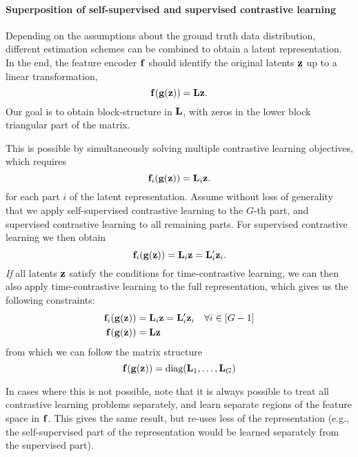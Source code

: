     \paragraph{Superposition of self-supervised and supervised contrastive learning}

        Depending on the assumptions about the ground truth data distribution, different estimation schemes can be combined to obtain a latent representation. In the end, the feature encoder $\mathbf{f}$ should identify the original latents $\mathbf{z}$ up to a linear transformation,
        \begin{equation}
            \mathbf{f}(\mathbf{g}(\mathbf{z})) = \mathbf{L} \mathbf{z}.
        \end{equation}
        Our goal is to obtain block-structure in $\mathbf{L}$, with zeros in the lower block triangular part of the matrix.
        
        This is possible by simultaneously solving multiple contrastive learning objectives, which requires
        \begin{equation}
            \mathbf{f}_i(\mathbf{g}(\mathbf{z})) = \mathbf{L}_i \mathbf{z}.
        \end{equation}
        for each part $i$ of the latent representation.
        Assume without loss of generality that we apply self-supervised contrastive learning to the $G$-th part, and supervised contrastive learning to all remaining parts.
        For supervised contrastive learning we then obtain
        \begin{equation}
            \mathbf{f}_i(\mathbf{g}(\mathbf{z})) = \mathbf{L}_i \mathbf{z} = \mathbf{L}'_i \mathbf{z}_i.
        \end{equation}
        \emph{If} all latents $\mathbf{z}$ satisfy the conditions for time-contrastive learning, we can then also apply time-contrastive learning to the full representation, which gives us the following constraints:
        \begin{align}
            \mathbf{f}_i(\mathbf{g}(\mathbf{z})) &= \mathbf{L}_i \mathbf{z} = \mathbf{L}'_i \mathbf{z}_i \quad \forall i\in[G-1] \\
            \mathbf{f}(\mathbf{g}(\mathbf{z})) &= \mathbf{L} \mathbf{z}
        \end{align}
        from which we can follow the matrix structure
        \begin{equation}
            \mathbf{f}(\mathbf{g}(\mathbf{z})) = \text{diag}(\mathbf{L}_1, \dots, \mathbf{L}_G)
        \end{equation}

        In cases where this is not possible, note that it is always possible to treat all contrastive learning problems separately, and learn separate regions of the feature space in $\mathbf{f}$. This gives the same result, but re-uses less of the representation (e.g., the self-supervised part of the representation would be learned separately from the supervised part).

